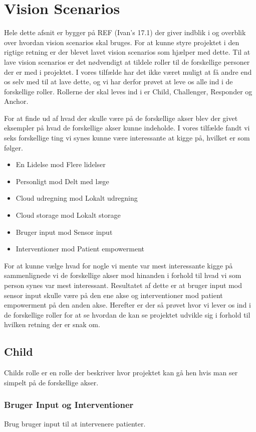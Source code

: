 \section{Vision Scenarios}
Hele dette afsnit er bygger på REF (Ivan's 17.1) der giver indblik i og overblik over hvordan vision scenarios skal bruges.
For at kunne styre projektet i den rigtige retning er der blevet lavet vision scenarios som hjælper med dette.
Til at lave vision scenarios er det nødvendigt at tildele roller til de forskellige personer der er med i projektet.
I vores tilfælde har det ikke været muligt at få andre end os selv med til at lave dette, og vi har derfor prøvet at leve os alle ind i de forskellige roller.
Rollerne der skal leves ind i er Child, Challenger, Responder og Anchor.

For at finde ud af hvad der skulle være på de forskellige akser blev der givet eksempler på hvad de forskellige akser kunne indeholde.
I vores tilfælde fandt vi seks forskellige ting vi synes kunne være interessante at kigge på, hvilket er som følger.
\begin{itemize}
	\item En Lidelse mod Flere lidelser
	\item Personligt mod Delt med læge
	\item Cloud udregning mod Lokalt udregning
	\item Cloud storage mod Lokalt storage
	\item Bruger input mod Sensor input
	\item Interventioner mod Patient empowerment
\end{itemize}

For at kunne vælge hvad for nogle vi mente var mest interessante kigge på sammenlignede vi de forskellige akser mod hinanden i forhold til hvad vi som person synes var mest interessant.
Resultatet af dette er at bruger input mod sensor input skulle være på den ene akse og interventioner mod patient empowerment på den anden akse.
Herefter er der så prøvet hvor vi lever os ind i de forskellige roller for at se hvordan de kan se projektet udvikle sig i forhold til hvilken retning der er snak om.

\subsection{Child}
Childs rolle er en rolle der beskriver hvor projektet kan gå hen hvis man ser simpelt på de forskellige akser.

\subsubsection*{Bruger Input og Interventioner}
Brug bruger input til at intervenere patienter.
